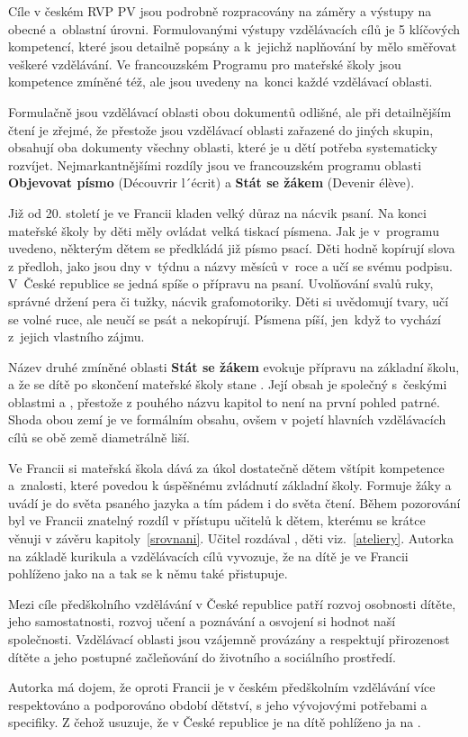 	Cíle v českém RVP PV jsou podrobně rozpracovány na záměry a výstupy na obecné a oblastní úrovni. Formulovanými výstupy vzdělávacích cílů je 5 klíčových kompetencí, které jsou detailně popsány a k jejichž naplňování by mělo směřovat veškeré vzdělávání. Ve francouzském Programu pro mateřské školy jsou kompetence zmíněné též, ale jsou uvedeny na konci každé vzdělávací oblasti.

	Formulačně jsou vzdělávací oblasti obou dokumentů odlišné, ale při detailnějším čtení je zřejmé, že přestože jsou vzdělávací oblasti zařazené do jiných skupin, obsahují oba dokumenty všechny oblasti, které je u dětí potřeba systematicky rozvíjet. Nejmarkantnějšími rozdíly jsou ve francouzském programu oblasti \textbf{Objevovat písmo} (Découvrir l´écrit) a \textbf{Stát se žákem} (Devenir élève).

	Již od 20. století je ve Francii kladen velký důraz na nácvik psaní. Na konci mateřské školy by děti měly ovládat velká tiskací písmena. Jak je v programu uvedeno, některým dětem se předkládá již písmo psací. Děti hodně kopírují slova z předloh, jako jsou dny v týdnu a názvy měsíců v roce a učí se svému podpisu. V České republice se jedná spíše o přípravu na psaní. Uvolňování svalů ruky, správné držení pera či tužky, nácvik grafomotoriky. Děti si uvědomují tvary, učí se volné ruce, ale neučí se psát a nekopírují. Písmena píší, jen když to vychází z jejich vlastního zájmu. 

	Název druhé zmíněné oblasti \textbf{Stát se žákem} evokuje přípravu na základní školu, a že se dítě po skončení mateřské školy stane . Její obsah je společný s českými oblastmi  a , přestože z pouhého názvu kapitol to není na první pohled patrné. Shoda obou zemí je ve formálním obsahu, ovšem v pojetí hlavních vzdělávacích cílů se obě země diametrálně liší.

	Ve Francii si mateřská škola dává za úkol dostatečně dětem vštípit kompetence a znalosti, které povedou k úspěšnému zvládnutí základní školy. Formuje žáky a uvádí je do světa psaného jazyka a tím pádem i do světa čtení. Během pozorování byl ve Francii znatelný rozdíl v přístupu učitelů k dětem, kterému se krátce věnuji v závěru kapitoly~\ref{srovnani}. Učitel rozdával , děti  viz.~\ref{ateliery}. Autorka na základě kurikula a vzdělávacích cílů vyvozuje, že na dítě je ve Francii pohlíženo jako na  a tak se k němu také přistupuje. 

	Mezi cíle předškolního vzdělávání v České republice patří rozvoj osobnosti dítěte, jeho samostatnosti, rozvoj učení a poznávání a osvojení si hodnot naší společnosti. Vzdělávací oblasti jsou vzájemně provázány a respektují přirozenost dítěte a jeho postupné začleňování do životního a sociálního prostředí. 

	Autorka má dojem, že oproti Francii je v českém předškolním vzdělávání více respektováno a podporováno období dětství, s jeho vývojovými potřebami a specifiky. Z čehož usuzuje, že v České republice je na dítě pohlíženo ja na .
